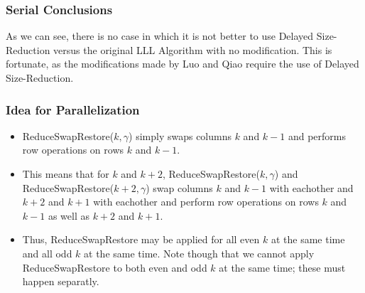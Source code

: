 \documentclass{beamer}
\begin{document}
\begin{frame}
\frametitle{Serial Conclusions}
As we can see, there is no case in which it is not better to use Delayed Size-Reduction versus the original LLL Algorithm with no modification.
This is fortunate, as the modifications made by Luo and Qiao require the use of Delayed Size-Reduction.
\end{frame}

\begin{frame}
\frametitle{Idea for Parallelization}
\begin{itemize}
\item ReduceSwapRestore($k,\gamma$) simply swaps columns $k$ and $k-1$ and performs row operations on rows $k$ and $k-1$.
\item This means that for $k$ and $k+2$, ReduceSwapRestore($k,\gamma$) and ReduceSwapRestore($k+2,\gamma$) swap columns $k$ and $k-1$ with eachother and $k+2$ and $k+1$ with eachother and perform row operations on rows $k$ and $k-1$ as well as $k+2$ and $k+1$.
\item Thus, ReduceSwapRestore may be applied for all even $k$ at the same time and all odd $k$ at the same time. Note though that we cannot apply ReduceSwapRestore to both even and odd $k$ at the same time; these must happen separatly.\cite{LuoQiaoParallelLLL}
\end{itemize}
\end{frame}
\end{document}
